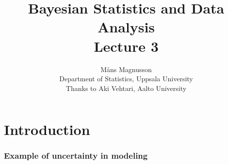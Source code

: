 \documentclass[10pt]{beamer}
\title[]{{\color{black}Bayesian Statistics and Data Analysis \\ Lecture 3}}
\author[]{M{\aa}ns Magnusson \\ Department of Statistics, Uppsala University \\ Thanks to Aki Vehtari, Aalto University}
\date{}
\begin{document}
\frame{\titlepage
}



\section{Introduction}

\begin{frame}

\frametitle{Example of uncertainty in modeling}



\end{frame}
\end{document}
